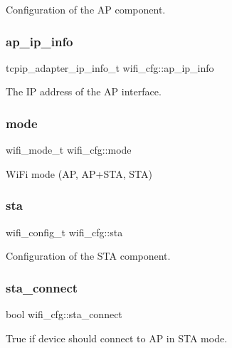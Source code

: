 Configuration of the AP component. \mbox{\label{structwifi__cfg_a937ab9f789423344a14f78a249f59aa4}} 
\subsubsection{\texorpdfstring{ap\_ip\_info}{ap\_ip\_info}}
{\footnotesize\ttfamily tcpip\+\_\+adapter\+\_\+ip\+\_\+info\+\_\+t wifi\+\_\+cfg\+::ap\+\_\+ip\+\_\+info}

The IP address of the AP interface. \mbox{\label{structwifi__cfg_a5e9dbc35ab4d5b816a9f0affc13e0068}} 
\subsubsection{\texorpdfstring{mode}{mode}}
{\footnotesize\ttfamily wifi\+\_\+mode\+\_\+t wifi\+\_\+cfg\+::mode}

Wi\+Fi mode (AP, A\+P+\+S\+TA, S\+TA) \mbox{\label{structwifi__cfg_ade4bdacd8530339bc13e489670f6c886}} 
\subsubsection{\texorpdfstring{sta}{sta}}
{\footnotesize\ttfamily wifi\+\_\+config\+\_\+t wifi\+\_\+cfg\+::sta}

Configuration of the S\+TA component. \mbox{\label{structwifi__cfg_afde977289add1255d8b86de8111f6696}} 
\subsubsection{\texorpdfstring{sta\_connect}{sta\_connect}}
{\footnotesize\ttfamily bool wifi\+\_\+cfg\+::sta\+\_\+connect}

True if device should connect to AP in S\+TA mode. \mbox{\label{structwifi__cfg_ad0a27da90280dcce96376d404bebebe8}} 
